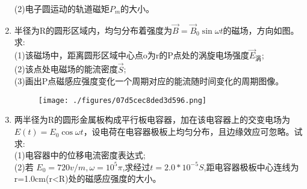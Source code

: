 \begin{enumerate}
(2)电子圆运动的轨道磁矩$P_m$的大小。
\item 半径为R的圆形区域内，均匀分布着强度为$\vec B=\vec B_0 \sin \omega t$的磁场，方向如图。求:\\
(1)该磁场中，距离圆形区域中心点o为r的P点处的涡旋电场强度$\vec E_\text{涡}$;\\
(2)该点处电磁场的能流密度$\vec S$;\\
(3)画出P点磁感应强度变化一个周期对应的能流随时间变化的周期图像。
\begin{figure}[ht]
\centering
\texttt{[image: ./figures/07d5cec8ded3d596.png]}
\caption{} \label{fig_SSD10_2}
\end{figure}
\item 两半径为R的圆形金属板构成平行板电容器，加在该电容器上的交变电场为$E(t)=E_0 \cos \omega t$，设电荷在电容器极板上均匀分布，且边缘效应可忽略。试求:\\
(1)电容器中的位移电流密度表达式;\\
(2)若 $E_0=720v/m,\omega=10^5\pi$,求经过$t=2.0*10^{-5}S$,距电容器极板中心连线为r=1.0cm(r<R)处的磁感应强度的大小。
\end{enumerate}

